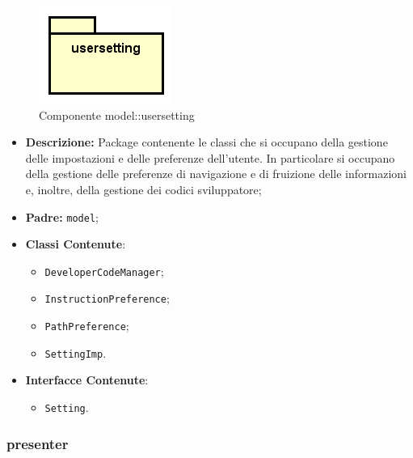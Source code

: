 \documentclass[../DefinizioneDiProdotto.tex]{subfiles}
\begin{document}
    \begin{figure}[H]
        \centering
        \includegraphics{img/package/usersetting.png}
        \caption{Componente model::\-usersetting}\label{fig:model::usersetting} 
    \end{figure}
    \begin{itemize}
\item \textbf{Descrizione:} Package contenente le classi che si occupano della gestione delle impostazioni e delle preferenze dell'utente. In particolare si occupano della gestione delle preferenze di navigazione e di fruizione delle informazioni e, inoltre, della gestione dei codici sviluppatore;
\item \textbf{Padre:} \texttt{model};
\item \textbf{Classi Contenute}:
\begin{itemize}
\item \texttt{DeveloperCodeManager};

\item \texttt{InstructionPreference};

\item \texttt{PathPreference};

\item \texttt{SettingImp}.

\end{itemize}
\item \textbf{Interfacce Contenute}:
\begin{itemize}
\item \texttt{Setting}.

\end{itemize}
\end{itemize}

\subsubsection{presenter}
\end{document}
